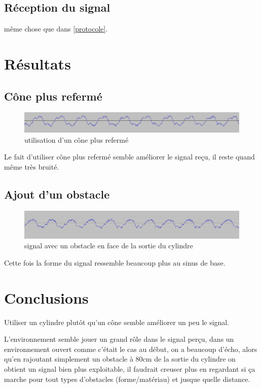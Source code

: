\documentclass[12pt,a4paper]{report}
\begin{document}
\subsection{Réception du signal}
même chose que dans \ref{protocole}.

\section{Résultats}
\subsection{Cône plus refermé}
\begin{figure}[H]
\includegraphics[width=\textwidth]{img/cone_90_plus_fin.png}
\caption{utilisation d'un cône plus refermé}
\end{figure}
Le fait d'utiliser cône plus refermé semble améliorer le signal reçu, il reste quand même très bruité.

\subsection{Ajout d'un obstacle}
\begin{figure}[H]
\includegraphics[width=\textwidth]{img/cone+obstacle.png}
\caption{signal avec un obstacle en face de la sortie du cylindre}
\end{figure}
Cette fois la forme du signal ressemble beaucoup plus au sinus de base.

\section{Conclusions}
Utiliser un cylindre plutôt qu'un cône semble améliorer un peu le signal.

L'environnement semble jouer un grand rôle dans le signal perçu, dans un environnement ouvert comme c'était le cas au début, on a beaucoup d'écho, alors qu'en rajoutant simplement un obstacle à 80cm de la sortie du cylindre  on obtient un signal bien plus exploitable, il faudrait creuser plus en regardant si ça marche pour tout types d'obstacles (forme/matériau) et jusque quelle distance.
\end{document}
